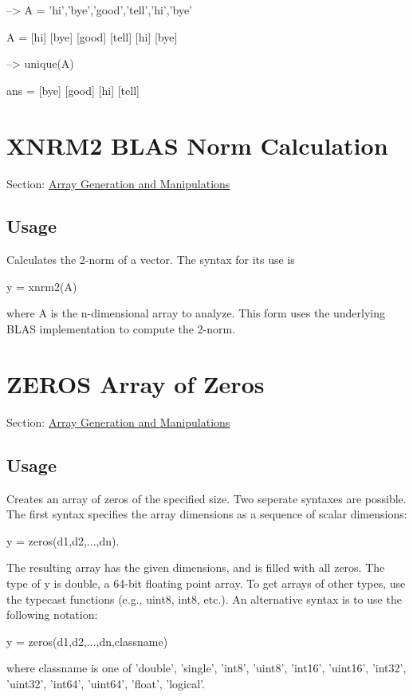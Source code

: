 \begin{DoxyVerbInclude}
--> A = {'hi','bye','good','tell','hi','bye'}

A = 
 [hi] [bye] [good] [tell] [hi] [bye] 

--> unique(A)

ans = 
 [bye] [good] [hi] [tell] 
\end{DoxyVerbInclude}
 \hypertarget{array_xnrm2}{}\section{X\-N\-R\-M2 B\-L\-A\-S Norm Calculation}\label{array_xnrm2}
Section\-: \hyperlink{sec_array}{Array Generation and Manipulations} \hypertarget{vtkwidgets_vtkxyplotwidget_Usage}{}\subsection{Usage}\label{vtkwidgets_vtkxyplotwidget_Usage}
Calculates the 2-\/norm of a vector. The syntax for its use is \begin{DoxyVerb}   y = xnrm2(A)
\end{DoxyVerb}
 where {\ttfamily A} is the n-\/dimensional array to analyze. This form uses the underlying B\-L\-A\-S implementation to compute the 2-\/norm. \hypertarget{array_zeros}{}\section{Z\-E\-R\-O\-S Array of Zeros}\label{array_zeros}
Section\-: \hyperlink{sec_array}{Array Generation and Manipulations} \hypertarget{vtkwidgets_vtkxyplotwidget_Usage}{}\subsection{Usage}\label{vtkwidgets_vtkxyplotwidget_Usage}
Creates an array of zeros of the specified size. Two seperate syntaxes are possible. The first syntax specifies the array dimensions as a sequence of scalar dimensions\-: \begin{DoxyVerb}   y = zeros(d1,d2,...,dn).
\end{DoxyVerb}
 The resulting array has the given dimensions, and is filled with all zeros. The type of {\ttfamily y} is {\ttfamily double}, a 64-\/bit floating point array. To get arrays of other types, use the typecast functions (e.\-g., {\ttfamily uint8}, {\ttfamily int8}, etc.). An alternative syntax is to use the following notation\-: \begin{DoxyVerb}   y = zeros(d1,d2,...,dn,classname)
\end{DoxyVerb}
 where {\ttfamily classname} is one of 'double', 'single', 'int8', 'uint8', 'int16', 'uint16', 'int32', 'uint32', 'int64', 'uint64', 'float', 'logical'.

